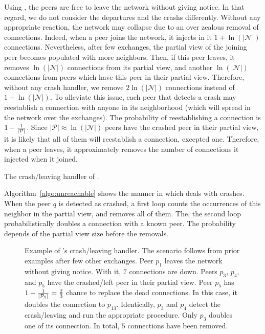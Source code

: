 Using \SCAMPLON{}, the peers are free to leave the network without giving
notice. In that regard, we do not consider the departures and the crashs
differently.  Without any appropriate reaction, the network may collapse due to
an over zealous removal of connections. Indeed, when a peer joins the network,
it injects in it $1+\ln(|\mathcal{N}|)$ connections. Nevertheless, after few
exchanges, the partial view of the joining peer becomes populated with more
neighbors. Then, if this peer leaves, it removes $\ln(|\mathcal{N}|)$
connections from its partial view, and another $\ln(|\mathcal{N}|)$ connections
from peers which have this peer in their partial view. Therefore, without any
crash handler, we remove $2\ln(|\mathcal{N}|)$ connections instead of
$1+\ln(|\mathcal{N}|)$. To alleviate this issue, each peer that detects a crash
may reestablish a connection with anyone in its neighborhood (which will spread
in the network over the exchanges). The probability of reestablishing a
connection is $1-{1\over{|\mathcal{P}|}}$. Since
${|\mathcal{P}|}\approx \ln(|\mathcal{N}|)$ peers have the crashed peer in
their partial view, it is likely that all of them will reestablish a
connection, excepted one. Therefore, when a peer leaves, it approximately
removes the number of connections it injected when it joined.

\begin{algorithm}
  
  \caption{\label{algo:unreachable}The crash/leaving handler of \SCAMPLON{}.}
\end{algorithm}

Algorithm~\ref{algo:unreachable} shows the manner in which \SCAMPLON{} deals
with crashes. When the peer $q$ is detected as crashed, a first loop counts the
occurrences of this neighbor in the partial view, and removes all of them. The,
the second loop probabilistically doubles a connection with a known peer. The
probability depends of the partial view size before the removals.

\begin{figure}
  
  \caption{\label{fig:crashexample}Example of \SCAMPLON{}'s crash/leaving
    handler. The scenario follows from prior examples after few other
    exchanges. Peer $p_1$ leaves the network without giving notice. With it,
    $7$ connections are down. Peers $p_3$, $p_4$, and $p_5$ have the
    crashed/left peer in their partial view. Peer $p_5$ has
    $1-{1\over{|\mathcal{P}_5|}}={2\over{3}}$ chance to replace the dead
    connections. In this case, it doubles the connection to
    $p_{13}$. Identically, $p_3$ and $p_4$ detect the crash/leaving and run the
    appropriate procedure. Only $p_3$ doubles one of its connection. In total,
    $5$ connections have been removed.}
\end{figure}

